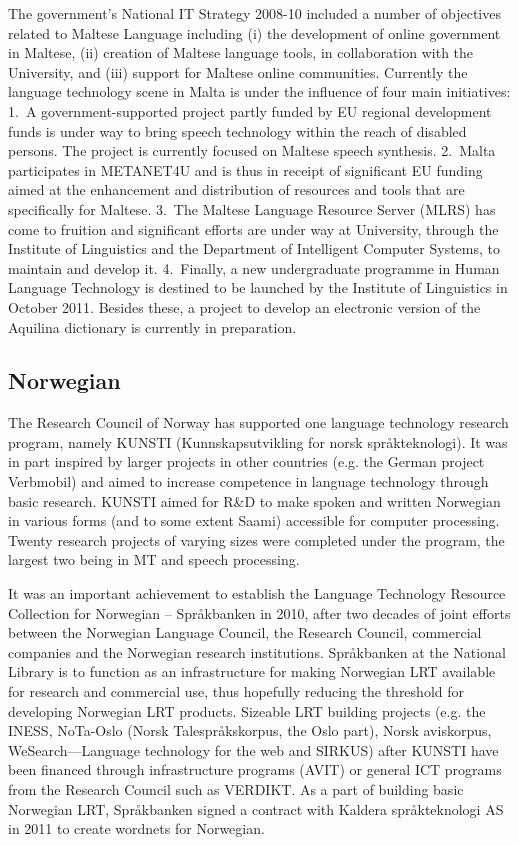 \documentclass[10pt, plain]{../../metanetpaper}
\begin{document}
\begin{multicols}{2}
\begin{small}
The government’s National IT Strategy 2008-10 included a number of objectives related to Maltese Language including (i) the development of online government in Maltese, (ii) creation of Maltese language tools, in collaboration with the University, and (iii) support for Maltese online communities.  Currently the language technology scene in Malta is under the influence of four main initiatives: 1.~A government-supported project partly funded by EU regional development funds is under way to bring speech technology within the reach of disabled persons. The project is currently focused on Maltese speech synthesis.  2.~Malta participates in METANET4U and is thus in receipt of significant EU funding aimed at the enhancement and distribution of resources and tools that are specifically for Maltese.  3.~The Maltese Language Resource Server (MLRS) has come to fruition and significant efforts are under way at University, through the Institute of Linguistics and the Department of Intelligent Computer Systems, to maintain and develop it.  4.~Finally, a new undergraduate programme in Human Language Technology is destined to be launched by the Institute of Linguistics in October 2011.  Besides these, a project to develop an electronic version of the Aquilina dictionary is currently in preparation.

\subsection*{Norwegian}
\label{sec:norwegian}

The Research Council of Norway has supported one language technology research program, namely KUNSTI (Kunnskapsutvikling for norsk språkteknologi). It was in part inspired by larger projects in other countries (e.g. the German project Verbmobil) and aimed to increase competence in language technology through basic research. KUNSTI aimed for R\&D to make spoken and written Norwegian in various forms (and to some extent Saami) accessible for computer processing. Twenty research projects of varying sizes were completed under the program, the largest two being in MT and speech processing.

It was an important achievement to establish the Language Technology Resource Collection for Norwegian – Språkbanken in 2010, after two decades of joint efforts between the Norwegian Language Council, the Research Council, commercial companies and the Norwegian research institutions. Språkbanken at the National Library is to function as an infrastructure for making Norwegian LRT available for research and commercial use, thus hopefully reducing the threshold for developing Norwegian LRT products. Sizeable LRT building projects (e.g. the INESS, NoTa-Oslo (Norsk Talespråkskorpus, the Oslo part), Norsk aviskorpus, WeSearch—Language technology for the web and SIRKUS) after KUNSTI have been financed through infrastructure programs (AVIT) or general ICT programs from the Research Council such as VERDIKT. As a part of building basic Norwegian LRT, Språkbanken signed a contract with Kaldera språkteknologi AS in 2011 to create wordnets for Norwegian.


\end{small}
\end{multicols}
\end{document}

